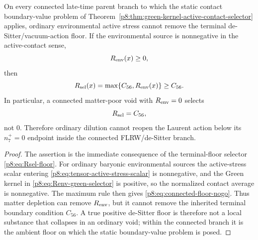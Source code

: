 \documentclass[12pt,a4paper]{article}
\begin{document}
\begin{proposition}
\label{p8:prop:connected-floor-nogo}
On every connected late-time parent branch to which the static contact boundary-value problem of Theorem~\ref{p8:thm:green-kernel-active-contact-selector} applies, ordinary environmental active stress cannot remove the terminal de-Sitter/vacuum-action floor.  If the environmental source is nonnegative in the active-contact sense,
\[
    R_{\rm env}(x)\ge 0,
\]
then
\begin{equation}
\label{p8:eq:connected-floor-nogo}
    R_{\rm sel}(x)=\max\{C_{56},R_{\rm env}(x)\}\ge C_{56}.
\end{equation}
In particular, a connected matter-poor void with \(R_{\rm env}=0\) selects
\[
    R_{\rm sel}=C_{56},
\]
not \(0\).  Therefore ordinary dilution cannot reopen the Laurent action below
its \(n_7^+=0\) endpoint inside the connected FLRW/de-Sitter branch.
\end{proposition}

\begin{proof}
The assertion is the immediate consequence of the terminal-floor selector \eqref{p8:eq:Rsel-floor}.  For ordinary baryonic environmental sources the active-stress scalar entering \eqref{p8:eq:tensor-active-stress-scalar} is nonnegative, and the Green kernel in \eqref{p8:eq:Renv-green-selector} is positive, so the normalized contact average is nonnegative.  The maximum rule then gives \eqref{p8:eq:connected-floor-nogo}.  Thus matter depletion can remove \(R_{\rm env}\), but it cannot remove the inherited terminal boundary condition \(C_{56}\).  A true positive de-Sitter floor is therefore not a local substance that collapses in an ordinary void; within the connected branch it is the ambient floor on which the static boundary-value problem is posed.
\end{proof}
\end{document}
